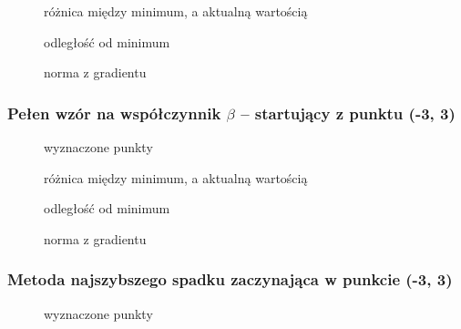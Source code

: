 \documentclass[a4paper, 10pt]{article}
\begin{document}
			    \begin{figure}[H]
			        \centering
			        \def \svgwidth{0.75\columnwidth}
			        
			        \caption{różnica między minimum, a aktualną wartością}
			    \end{figure}\noindent
			
			    \begin{figure}[H]
			        \centering
			        \def \svgwidth{0.75\columnwidth}
			        
			        \caption{odległość od minimum}
			    \end{figure}\noindent
				
				\begin{figure}[H]
					\centering
					\def \svgwidth{0.75\columnwidth}
					
					\caption{norma z gradientu}
				\end{figure}\noindent
			\subsubsection{Pełen wzór na współczynnik $\beta$ -- startujący z punktu (-3, 3)}		
			    \begin{figure}[H]
			        \centering
			        \def \svgwidth{0.75\columnwidth}
			        
			        \caption{wyznaczone punkty}
			    \end{figure}\noindent
			
			    \begin{figure}[H]
			        \centering
			        \def \svgwidth{0.75\columnwidth}
			        
			        \caption{różnica między minimum, a aktualną wartością}
			    \end{figure}\noindent
			
			    \begin{figure}[H]
			        \centering
			        \def \svgwidth{0.75\columnwidth}
			        
			        \caption{odległość od minimum}
			    \end{figure}\noindent
			    
    			\begin{figure}[H]
    				\centering
    				\def \svgwidth{0.75\columnwidth}
    				
    				\caption{norma z gradientu}
    			\end{figure}\noindent
			    
			 \subsubsection{Metoda najszybszego spadku zaczynająca w punkcie (-3, 3)}
			 \begin{figure}[H]
			 	\centering
			 	\def \svgwidth{0.75\columnwidth}
			 	
			 	\caption{wyznaczone punkty}
			 \end{figure}\noindent
			 
\end{document}
